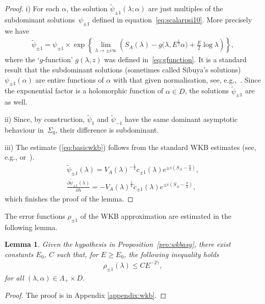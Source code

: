 \documentclass[pdftex]{sigma}
\numberwithin{equation}{section}
\newtheorem{lem}[thm]{Lemma}
\newcommand{\la}{\lambda}
\newcommand{\al}{\alpha}
\begin{document}
\begin{proof} i) For each $\al$, the solution $\widetilde{\psi}_{\pm1}(\la;\al)$ are just multiples of the subdominant solu\-tions~$\psi_{\pm1}$ def\/ined in equation~\eqref{eq:scalarpsi10}. More precisely we have
	\begin{gather*}
	\widetilde{\psi}_{\pm1}=\psi_{\pm1} \times
	\exp\left\lbrace\lim_{\la \to \pm i \infty} \left( S_A(\la)- g\big(\la,E^{\frac12}\al\big)+\frac{E}{2} \log \la \right) \right\rbrace ,
	\end{gather*}
	where the `$g$-function' $g(\la,z)$ was def\/ined in~\eqref{eq:gfunction}. It is a standard result that the subdominant solutions (sometimes called Sibuya's solutions) $\psi_{\pm1}(\al)$ are entire functions of $\al$ with that given normalisation, see, e.g.,~\cite{sibuya75}. Since the exponential factor is a holomorphic function of $\al \in D$, the solutions $\widetilde{\psi}_{\pm1}$ are as well.
	
ii) Since, by construction, $\widetilde{\psi}_1$ and $\widetilde{\psi}_{-1}$ have the same dominant asymptotic behaviour in~$\Sigma_0$, their dif\/ference is subdominant.
	
iii) The estimate (\ref{eq:basicwkb}) follows from the standard WKB estimates (see, e.g., \cite[Appendix]{piwkb} or~\cite{fedoryuk}).
	\begin{gather*}\nonumber
	 \widetilde{\psi}_{\pm1}(\la) =V_A(\la)^{-\frac14}c_{\pm1}(\la) e^{ \pm i ( S_A-\frac{\pi}{4}) }, \\
	 \frac{\partial \widetilde{\psi}_{\pm1}(\la)}{\partial \la} =-V_A(\la)^{\frac14} \tilde{c}_{\pm1}(\la) e^{ \pm i ( S_A-\frac{\pi}{4})},
	\end{gather*}
	which f\/inishes the proof of the lemma.
\end{proof}


The error functions $\rho_{\pm1}$ of the WKB approximation are estimated in the following lemma.
\begin{lem}\label{lem:errors}
	Given the hypothesis in Proposition~{\rm \ref{pro:wkbasy}}, there exist constants $E_0$, $C$ such that, for $E\geq E_0$, the following inequality holds
	\begin{gather*}
	\rho_{\pm1}(\la)\leq C E^{- 2 \gamma},
	\end{gather*}
	for all $(\la,\al) \in \Lambda_+ \times D$.
\end{lem}
\begin{proof}
		The proof is in Appendix \ref{appendix:wkb}.
\end{proof}
\end{document}
